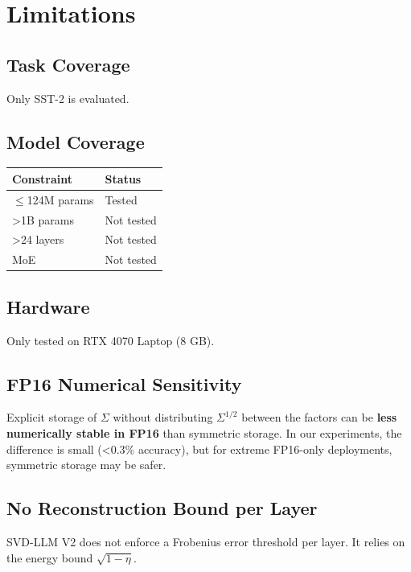 
\section{Limitations}

\subsection{Task Coverage}

Only SST-2 is evaluated.

\subsection{Model Coverage}

\begin{table}[H]
\centering
\small
\begin{tabular}{ll}
\toprule
\textbf{Constraint} & \textbf{Status} \\
\midrule
$\le$124M params & Tested \\
>1B params & Not tested \\
>24 layers & Not tested \\
MoE & Not tested \\
\bottomrule
\end{tabular}
\end{table}

\subsection{Hardware}

Only tested on RTX 4070 Laptop (8 GB).

\subsection{FP16 Numerical Sensitivity}

Explicit storage of $\Sigma$ without distributing $\Sigma^{1/2}$ between 
the factors can be \textbf{less numerically stable in FP16} than symmetric 
storage. In our experiments, the difference is small (<0.3\% accuracy), 
but for extreme FP16-only deployments, symmetric storage may be safer.

\subsection{No Reconstruction Bound per Layer}

SVD-LLM V2 does not enforce a Frobenius error threshold per layer. It relies 
on the energy bound $\sqrt{1 - \eta}$.

